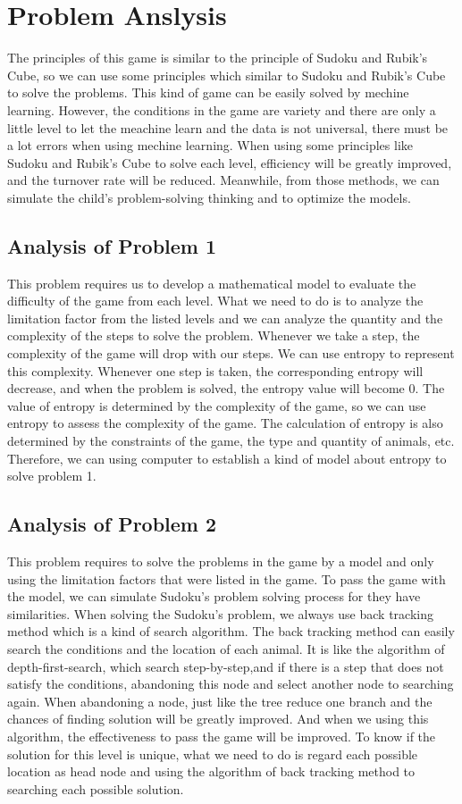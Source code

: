 \documentclass[12pt,a4paper,]{article}
\begin{document}
\section{Problem Anslysis}
The principles of this game is similar to the principle of Sudoku and Rubik's Cube, so we can use some principles which similar to Sudoku and Rubik's Cube to solve the problems. This kind of game can be easily solved by mechine learning. However, the conditions in the game are variety and there are only a little level to let the meachine learn and the data is not universal, there must be a lot errors when using mechine learning.  When using some principles like Sudoku and Rubik's Cube to solve each level, efficiency will be greatly improved, and the turnover rate will be reduced. Meanwhile, from those methods, we can simulate the child's problem-solving thinking and to optimize the models.

\subsection{Analysis of Problem 1}

This problem requires us to develop a mathematical model to evaluate the difficulty of the game from each level. What we need to do is to analyze the limitation factor from the listed levels and we can analyze the quantity and the complexity of the steps to solve the problem. Whenever we take a step, the complexity of the game will drop with our steps. We can use entropy to represent this complexity. Whenever one step is taken, the corresponding entropy will decrease, and when the problem is solved, the entropy value will become 0.  The value of entropy is determined by the complexity of the game, so we can use entropy to assess the complexity of the game. The calculation of entropy is also determined by the constraints of the game, the type and quantity of animals, etc. Therefore, we can using computer to establish a kind of model about entropy to solve problem 1.

\subsection{Analysis of Problem 2}
This problem requires to solve the problems in the game by a model and only using the limitation factors that were listed in the game. To pass the game with the model, we can simulate Sudoku's problem solving process for they have similarities. When solving the Sudoku's problem, we always use back tracking method which is a kind of search algorithm.  The back tracking method can easily search the conditions and the location of each animal. It is like the algorithm of depth-first-search, which search step-by-step,and if there is a step that does not satisfy the conditions, abandoning this node and select another node to searching again. When abandoning a node, just like the tree  reduce one branch and the chances of finding solution will be greatly improved. And when we using this algorithm, the effectiveness to pass the game will  be improved. To know if the solution for this level is unique, what we need to do is regard each possible location as head node and using the algorithm of back tracking method to searching each possible solution. 
\end{document}
